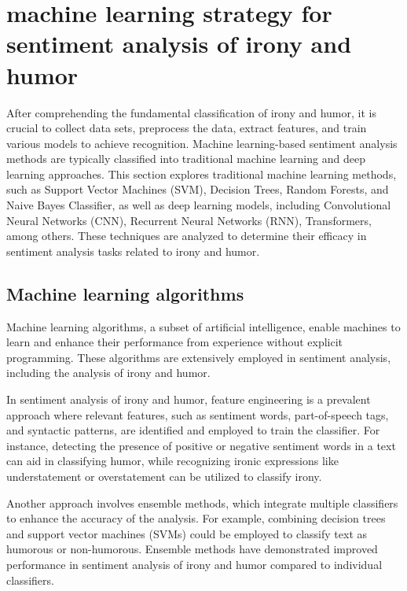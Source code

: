 \documentclass[a4paper]{article}
\begin{document}
\section{machine learning strategy for sentiment analysis of irony and humor}

After comprehending the fundamental classification of irony and humor, it is crucial to collect data sets, preprocess the data, extract features, and train various models to achieve recognition. Machine learning-based sentiment analysis methods are typically classified into traditional machine learning and deep learning approaches. This section explores traditional machine learning methods, such as Support Vector Machines (SVM), Decision Trees, Random Forests, and Naive Bayes Classifier, as well as deep learning models, including Convolutional Neural Networks (CNN), Recurrent Neural Networks (RNN), Transformers, among others. These techniques are analyzed to determine their efficacy in sentiment analysis tasks related to irony and humor.

\subsection{Machine learning algorithms}

Machine learning algorithms, a subset of artificial intelligence, enable machines to learn and enhance their performance from experience without explicit programming. These algorithms are extensively employed in sentiment analysis, including the analysis of irony and humor.

In sentiment analysis of irony and humor, feature engineering is a prevalent approach where relevant features, such as sentiment words, part-of-speech tags, and syntactic patterns, are identified and employed to train the classifier. For instance, detecting the presence of positive or negative sentiment words in a text can aid in classifying humor, while recognizing ironic expressions like understatement or overstatement can be utilized to classify irony.

Another approach involves ensemble methods, which integrate multiple classifiers to enhance the accuracy of the analysis. For example, combining decision trees and support vector machines (SVMs) could be employed to classify text as humorous or non-humorous. Ensemble methods have demonstrated improved performance in sentiment analysis of irony and humor compared to individual classifiers.
\end{document}

